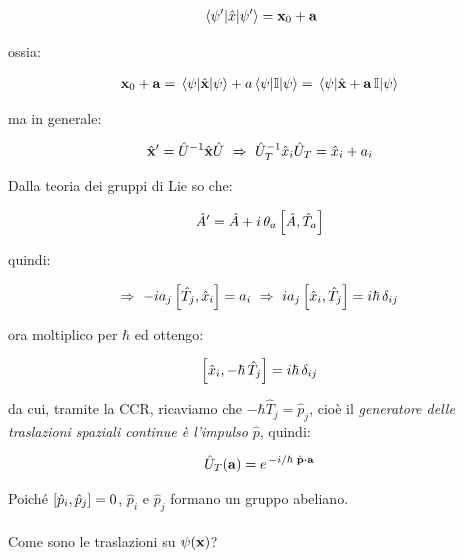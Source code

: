 \begin{align*}
	\mel{\psi'}{\hat{x}}{\psi'} = \vb{x}_0 + \vb{a}
\end{align*}

	ossia:
	
\begin{align*}
	\vb{x}_0 + \vb{a} = \mel{\psi}{\hat{\vb{x}}}{\psi} + a \mel{\psi}{\mathbb{I}}{\psi} = \mel{\psi}{\hat{\vb{x}} + \vb{a} \, \mathbb{I}}{\psi}
\end{align*}

	ma in generale:
	
\begin{align*}
	\hat{\vb{x}}' = \hat{U}^{-1} \hat{\vb{x}}\hat{U} \, \, \Rightarrow \, \, \hat{U}_T^{-1} \hat{x}_i \hat{U}_T = \hat{x}_i + a_i
\end{align*}

	Dalla teoria dei gruppi di Lie so che:
	
\begin{align*}
	\hat{A}' = \hat{A} + i \, \theta_a \, \qty[\hat{A}, \hat{T}_a]
\end{align*}
	
	quindi:
	
	
\begin{align*}
	\Rightarrow \, \, - i a_j \, \qty[\hat{T}_j, \hat{x}_i] = a_i \, \, \Rightarrow \, \, i a_j \, \qty[\hat{x}_i, \hat{T}_j] = i \hbar \, \delta_{ij}
\end{align*}

	ora moltiplico per $\hbar$ ed ottengo:
	
\begin{align*}
	\qty[\hat{x}_i, - \hbar \, \hat{T}_j] = i \hbar \, \delta_{ij}
\end{align*}

	da cui, tramite la CCR, ricaviamo che $ - \hbar \hat{T}_j = \hat{p}_j$, cioè il \textit{generatore delle traslazioni spaziali continue è l'impulso} $\hat{p}$, quindi:
	
\begin{align*}
	\hat{U}_T(\vb{a}) = e^{ \, - i/\hbar \,\, \hat{\vb{p}} \vdot \vb{a}} 
\end{align*}

	Poiché $\qty[\hat{p}_i, \hat{p}_j] = 0$, $\hat{p}_i$ e $\hat{p}_j$ formano un gruppo abeliano.
	\\
	\\
	Come sono le traslazioni su $\psi(\vb{x})$?
	
